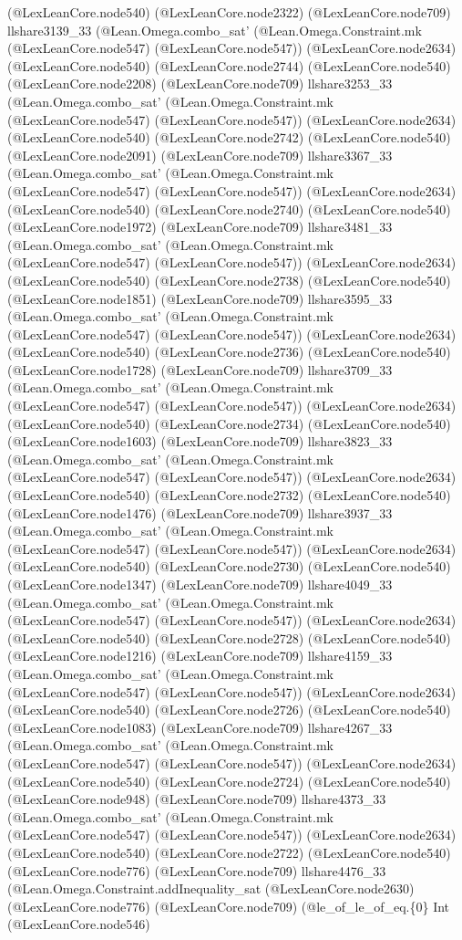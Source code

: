 \documentclass[11pt]{article}
\begin{document}
(@LexLeanCore.node540) (@LexLeanCore.node2322) (@LexLeanCore.node709) llshare3139\_33 (@Lean.Omega.combo\_sat' (@Lean.Omega.Constraint.mk (@LexLeanCore.node547) (@LexLeanCore.node547)) (@LexLeanCore.node2634) (@LexLeanCore.node540) (@LexLeanCore.node2744) (@LexLeanCore.node540) (@LexLeanCore.node2208) (@LexLeanCore.node709) llshare3253\_33 (@Lean.Omega.combo\_sat' (@Lean.Omega.Constraint.mk (@LexLeanCore.node547) (@LexLeanCore.node547)) (@LexLeanCore.node2634) (@LexLeanCore.node540) (@LexLeanCore.node2742) (@LexLeanCore.node540) (@LexLeanCore.node2091) (@LexLeanCore.node709) llshare3367\_33 (@Lean.Omega.combo\_sat' (@Lean.Omega.Constraint.mk (@LexLeanCore.node547) (@LexLeanCore.node547)) (@LexLeanCore.node2634) (@LexLeanCore.node540) (@LexLeanCore.node2740) (@LexLeanCore.node540) (@LexLeanCore.node1972) (@LexLeanCore.node709) llshare3481\_33 (@Lean.Omega.combo\_sat' (@Lean.Omega.Constraint.mk (@LexLeanCore.node547) (@LexLeanCore.node547)) (@LexLeanCore.node2634) (@LexLeanCore.node540) (@LexLeanCore.node2738) (@LexLeanCore.node540) (@LexLeanCore.node1851) (@LexLeanCore.node709) llshare3595\_33 (@Lean.Omega.combo\_sat' (@Lean.Omega.Constraint.mk (@LexLeanCore.node547) (@LexLeanCore.node547)) (@LexLeanCore.node2634) (@LexLeanCore.node540) (@LexLeanCore.node2736) (@LexLeanCore.node540) (@LexLeanCore.node1728) (@LexLeanCore.node709) llshare3709\_33 (@Lean.Omega.combo\_sat' (@Lean.Omega.Constraint.mk (@LexLeanCore.node547) (@LexLeanCore.node547)) (@LexLeanCore.node2634) (@LexLeanCore.node540) (@LexLeanCore.node2734) (@LexLeanCore.node540) (@LexLeanCore.node1603) (@LexLeanCore.node709) llshare3823\_33 (@Lean.Omega.combo\_sat' (@Lean.Omega.Constraint.mk (@LexLeanCore.node547) (@LexLeanCore.node547)) (@LexLeanCore.node2634) (@LexLeanCore.node540) (@LexLeanCore.node2732) (@LexLeanCore.node540) (@LexLeanCore.node1476) (@LexLeanCore.node709) llshare3937\_33 (@Lean.Omega.combo\_sat' (@Lean.Omega.Constraint.mk (@LexLeanCore.node547) (@LexLeanCore.node547)) (@LexLeanCore.node2634) (@LexLeanCore.node540) (@LexLeanCore.node2730) (@LexLeanCore.node540) (@LexLeanCore.node1347) (@LexLeanCore.node709) llshare4049\_33 (@Lean.Omega.combo\_sat' (@Lean.Omega.Constraint.mk (@LexLeanCore.node547) (@LexLeanCore.node547)) (@LexLeanCore.node2634) (@LexLeanCore.node540) (@LexLeanCore.node2728) (@LexLeanCore.node540) (@LexLeanCore.node1216) (@LexLeanCore.node709) llshare4159\_33 (@Lean.Omega.combo\_sat' (@Lean.Omega.Constraint.mk (@LexLeanCore.node547) (@LexLeanCore.node547)) (@LexLeanCore.node2634) (@LexLeanCore.node540) (@LexLeanCore.node2726) (@LexLeanCore.node540) (@LexLeanCore.node1083) (@LexLeanCore.node709) llshare4267\_33 (@Lean.Omega.combo\_sat' (@Lean.Omega.Constraint.mk (@LexLeanCore.node547) (@LexLeanCore.node547)) (@LexLeanCore.node2634) (@LexLeanCore.node540) (@LexLeanCore.node2724) (@LexLeanCore.node540) (@LexLeanCore.node948) (@LexLeanCore.node709) llshare4373\_33 (@Lean.Omega.combo\_sat' (@Lean.Omega.Constraint.mk (@LexLeanCore.node547) (@LexLeanCore.node547)) (@LexLeanCore.node2634) (@LexLeanCore.node540) (@LexLeanCore.node2722) (@LexLeanCore.node540) (@LexLeanCore.node776) (@LexLeanCore.node709) llshare4476\_33 (@Lean.Omega.Constraint.addInequality\_sat (@LexLeanCore.node2630) (@LexLeanCore.node776) (@LexLeanCore.node709) (@le\_of\_le\_of\_eq.\{0\} Int (@LexLeanCore.node546) 
\end{document}
